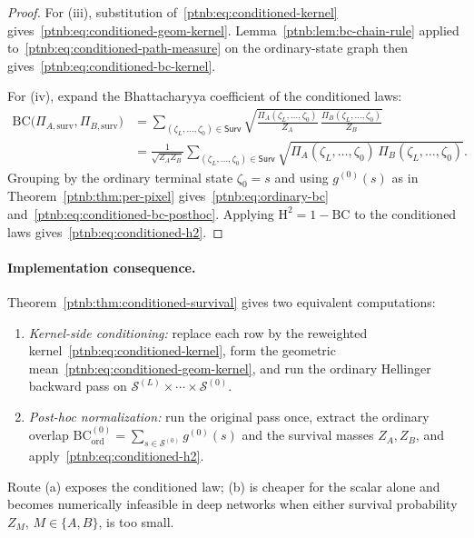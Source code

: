 \begin{proof}
For (iii), substitution of~\eqref{ptnb:eq:conditioned-kernel} gives~\eqref{ptnb:eq:conditioned-geom-kernel}.
Lemma~\ref{ptnb:lem:bc-chain-rule} applied to~\eqref{ptnb:eq:conditioned-path-measure}
on the ordinary-state graph then gives~\eqref{ptnb:eq:conditioned-bc-kernel}.

For (iv), expand the Bhattacharyya coefficient of the conditioned laws:
\begin{align}
    \mathrm{BC}\!\bigl(\Pi_{A,\mathrm{surv}}, \Pi_{B,\mathrm{surv}}\bigr)
    &=
    \sum_{(\zeta_L,\ldots,\zeta_0)\in\mathsf{Surv}}
    \sqrt{\frac{\Pi_A(\zeta_L,\ldots,\zeta_0)}{Z_A}\,
    \frac{\Pi_B(\zeta_L,\ldots,\zeta_0)}{Z_B}} \\
    &=
    \frac{1}{\sqrt{Z_A Z_B}}
    \sum_{(\zeta_L,\ldots,\zeta_0)\in\mathsf{Surv}}
    \sqrt{\Pi_A(\zeta_L,\ldots,\zeta_0)\, \Pi_B(\zeta_L,\ldots,\zeta_0)}.
\end{align}
Grouping by the ordinary terminal state $\zeta_0=s$ and using $g^{(0)}(s)$ as in
Theorem~\ref{ptnb:thm:per-pixel} gives~\eqref{ptnb:eq:ordinary-bc} and~\eqref{ptnb:eq:conditioned-bc-posthoc}.
Applying $\mathrm{H}^2=1-\mathrm{BC}$ to the conditioned laws gives~\eqref{ptnb:eq:conditioned-h2}.
\end{proof}

\paragraph{Implementation consequence.}
Theorem~\ref{ptnb:thm:conditioned-survival} gives two equivalent computations:
\begin{enumerate}
    \item[(a)] \emph{Kernel-side conditioning:} replace each row by the reweighted
        kernel~\eqref{ptnb:eq:conditioned-kernel}, form the geometric mean~\eqref{ptnb:eq:conditioned-geom-kernel},
        and run the ordinary Hellinger backward pass on $\mathcal{S}^{(L)} \times \cdots \times
            \mathcal{S}^{(0)}$.
    \item[(b)] \emph{Post-hoc normalization:} run the original pass once, extract the ordinary overlap
        $\mathrm{BC}_{\mathrm{ord}}^{(0)} = \sum_{s \in \mathcal{S}^{(0)}} g^{(0)}(s)$ and the survival
        masses $Z_A, Z_B$, and apply~\eqref{ptnb:eq:conditioned-h2}.
\end{enumerate}
Route (a) exposes the conditioned law; (b) is cheaper for the scalar alone and
becomes numerically infeasible in deep networks when either survival probability
$Z_M$, $M\in\{A,B\}$, is too small.

